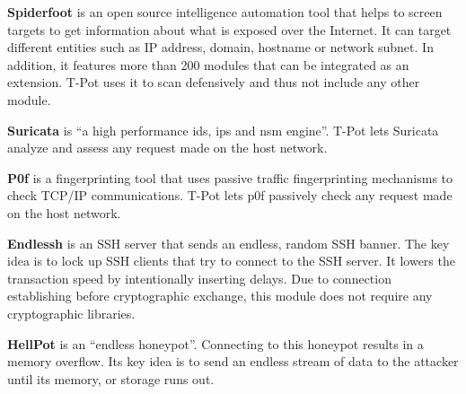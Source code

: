 \textbf{Spiderfoot} \cite{spiderfoot2021} is an open source intelligence automation tool that helps to screen targets to get information about what is exposed over the Internet.
It can target different entities such as IP address, domain, hostname or network subnet.
In addition, it features more than 200 modules that can be integrated as an extension.
T-Pot uses it to scan defensively and thus not include any other module.

\textbf{Suricata} \cite{suricata2021} is \enquote{a high performance \ac{ids}, \ac{ips} and \ac{nsm} engine}.
T-Pot lets Suricata analyze and assess any request made on the host network.

\textbf{P0f} \cite{p0f2021} is a fingerprinting tool that uses passive traffic fingerprinting mechanisms to check TCP/IP communications.
T-Pot lets p0f passively check any request made on the host network.

\textbf{Endlessh} \cite{endlessh2021} is an SSH server that sends an endless, random SSH banner.
The key idea is to lock up SSH clients that try to connect to the SSH server.
It lowers the transaction speed by intentionally inserting delays.
Due to connection establishing before cryptographic exchange, this module does not require any cryptographic libraries.

\textbf{HellPot} \cite{hellpot2021} is an \enquote{endless honeypot}.
Connecting to this honeypot results in a memory overflow.
Its key idea is to send an endless stream of data to the attacker until its memory, or storage runs out.

